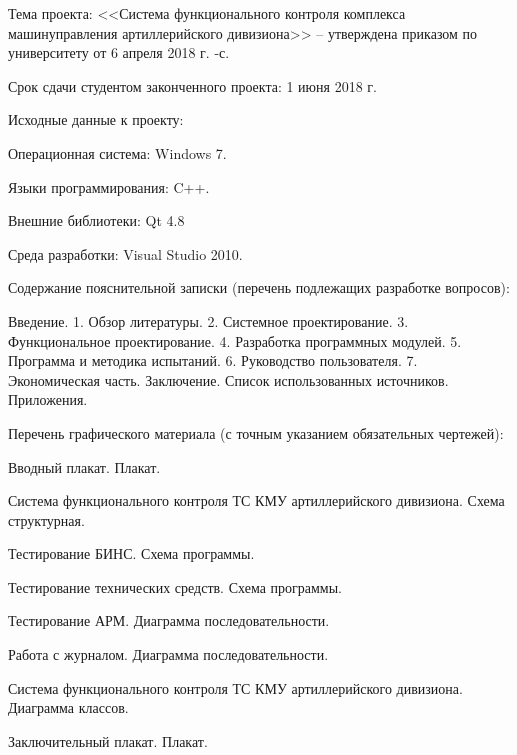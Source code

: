 {    %
	    \begin{legal}[leftmargin=*,label={\arabic*}]
	    \item Тема проекта: <<Система функционального контроля комплекса машин\break управления артиллерийского дивизиона>> --
		    утверждена приказом по университету от 6 апреля 2018 г. -с.

		    \vspace{1em}

	    \item Срок сдачи студентом законченного проекта: 1 июня 2018 г.

		    \vspace{1em}

	    \item Исходные данные к проекту:

		    \begin{legal}[label*={.\arabic*}]
		    \item Операционная система: Windows 7.
		    \item Языки программирования: C++.
		    \item Внешние библиотеки: Qt 4.8
		    \item Среда разработки: Visual Studio 2010.
		    \end{legal}

		    \vspace{1em}

	    \item Содержание пояснительной записки (перечень подлежащих разработке вопросов):

		    Введение.
		    1. Обзор литературы.
		    2. Системное проектирование.
		    3. Функциональное проектирование.
		    4. Разработка программных модулей.
		    5. Программа и методика испытаний.
		    6. Руководство пользователя.
		    7. Экономическая часть.
		    Заключение.
		    Список использованных источников.
		    Приложения.

		    \vspace{1em}

	    \item Перечень графического материала (с точным указанием обязательных чертежей):
		    \begin{legal}[label*={.\arabic*}]
		    \item Вводный плакат. Плакат.
			    \clearpage
			    \thispagestyle{empty}
		    \item Система функционального контроля ТС КМУ артиллерийского дивизиона. Схема структурная.
		    \item Тестирование БИНС. Схема программы.
		    \item Тестирование технических средств. Схема программы.
		    \item Тестирование АРМ. Диаграмма последовательности.
		    \item Работа с журналом. Диаграмма последовательности.
		    \item Система функционального контроля ТС КМУ артиллерийского дивизиона. Диаграмма классов.
		    \item Заключительный плакат. Плакат.
		    \end{legal}


\end{legal}}
